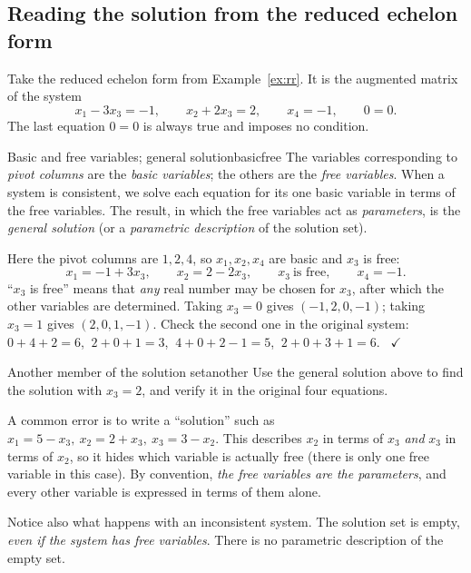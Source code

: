 \documentclass[11pt]{article}
\begin{document}
\subsection*{Reading the solution from the reduced echelon form}
 
Take the reduced echelon form from Example~\ref{ex:rr}. It is the augmented matrix of the system
\[
x_1-3x_3=-1,\qquad x_2+2x_3=2,\qquad x_4=-1,\qquad 0=0.
\]
The last equation $0=0$ is always true and imposes no condition.
 
\begin{defn}{Basic and free variables; general solution}{basicfree}
The variables corresponding to \emph{pivot columns} are the \emph{basic variables}; the others are the
\emph{free variables}. When a system is consistent, we solve each equation for its one basic variable
in terms of the free variables. The result, in which the free variables act as \emph{parameters},
is the \emph{general solution} (or a \emph{parametric description} of the solution set).
\end{defn}
 
Here the pivot columns are $1,2,4$, so $x_1,x_2,x_4$ are basic and $x_3$ is free:
\[
x_1=-1+3x_3,\qquad x_2=2-2x_3,\qquad x_3\ \text{is free},\qquad x_4=-1.
\]
``$x_3$ is free'' means that \emph{any} real number may be chosen for $x_3$, after which the other
variables are determined. Taking $x_3=0$ gives $(-1,2,0,-1)$; taking $x_3=1$ gives $(2,0,1,-1)$. Check
the second one in the original system:
$0+4+2=6$, $\ 2+0+1=3$, $\ 4+0+2-1=5$, $\ 2+0+3+1=6$. \ $\checkmark$
 
\begin{kc}{Another member of the solution set}{another}
Use the general solution above to find the solution with $x_3=2$, and verify it in the original
four equations.
\end{kc}
 
\begin{warn}
A common error is to write a ``solution'' such as
$x_1=5-x_3,\ x_2=2+x_3,\ x_3=3-x_2$. This describes $x_2$ in terms of $x_3$ \emph{and} $x_3$ in terms of
$x_2$, so it hides which variable is actually free (there is only one free variable in this case).
By convention, \emph{the free variables are the parameters}, and every other variable is expressed in
terms of them alone.
\end{warn}
 
Notice also what happens with an inconsistent system. The solution set is empty, \emph{even if the
system has free variables}. There is no parametric description of the empty set.
 
\end{document}
